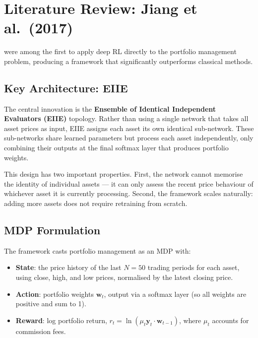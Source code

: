 \documentclass[12pt,a4paper]{article}
\begin{document}
\section{Literature Review: Jiang et al.\ (2017)}
\label{sec:litreview}

\citet{jiang2017deep} were among the first to apply deep RL directly
to the portfolio management problem, producing a framework that
significantly outperforms classical methods.

\subsection{Key Architecture: EIIE}

The central innovation is the \textbf{Ensemble of Identical Independent
Evaluators (EIIE)} topology. Rather than using a single network that
takes all asset prices as input, EIIE assigns each asset its own
identical sub-network. These sub-networks share learned parameters but
process each asset independently, only combining their outputs at the
final softmax layer that produces portfolio weights.

This design has two important properties. First, the network cannot
memorise the identity of individual assets --- it can only assess
the recent price behaviour of whichever asset it is currently
processing. Second, the framework scales naturally: adding more assets
does not require retraining from scratch.

\subsection{MDP Formulation}

The framework casts portfolio management as an MDP with:
\begin{itemize}[nosep]
  \item \textbf{State}: the price history of the last $N=50$ trading
        periods for each asset, using close, high, and low prices,
        normalised by the latest closing price.
  \item \textbf{Action}: portfolio weights $\mathbf{w}_t$, output via
        a softmax layer (so all weights are positive and sum to 1).
  \item \textbf{Reward}: log portfolio return,
        $r_t = \ln(\mu_t \mathbf{y}_t \cdot \mathbf{w}_{t-1})$,
        where $\mu_t$ accounts for commission fees.
\end{itemize}
\end{document}
